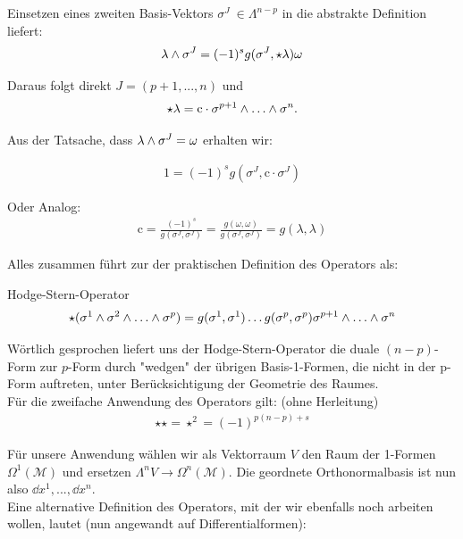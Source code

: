 Einsetzen eines zweiten Basis-Vektors $\sigma^J \ \in \Lambda^{n-p}$ in die abstrakte Definition liefert:
\begin{align}
\lambda \wedge \sigma^J = (-1)^s g(\sigma^J,\star \lambda)\omega
\end{align}

Daraus folgt direkt $J = (p+1, ..., n)$ und 
\begin{align}
\star\lambda = \text{c} \cdot \sigma^{p+1} \w \dots \w \sigma^n.
\end{align}

Aus der Tatsache, dass $\lambda \wedge \sigma^J = \omega$ erhalten wir:

\begin{align}
1 = (-1)^s g(\sigma^J,\text{c}\cdot\sigma^J)
\end{align}

Oder Analog:
\begin{align}
\text{c}= \frac{(-1)^s}{g(\sigma^J,\sigma^J)} = \frac{g(\omega,\omega)}{g(\sigma^J,\sigma^J)} = g(\lambda,\lambda)
\end{align}

Alles zusammen führt zur der praktischen Definition des Operators als:
\begin{mybox}{Hodge-Stern-Operator}
\begin{align}
\star(\sigma^1 \w \sigma^2 \w \dots \w \sigma^p) = g(\sigma^1,\sigma^1)\dots g(\sigma^p,\sigma^p) \sigma^{p+1}\w \dots \w \sigma^n
\end{align}
\end{mybox}


Wörtlich gesprochen liefert uns der Hodge-Stern-Operator die duale $(n-p)$-Form zur $p$-Form durch "wedgen" der übrigen Basis-1-Formen, die nicht in der p-Form auftreten, unter Berücksichtigung der Geometrie des Raumes. \\

 Für die zweifache Anwendung des Operators gilt: (ohne Herleitung)
 \begin{align}
 \star \star = \star^2 = (-1)^{p(n-p)+s}
 \end{align}


Für unsere Anwendung wählen wir als Vektorraum $V$ den Raum der 1-Formen $\Omega^1(\mathcal{M})$ und ersetzen $\Lambda^n V \rightarrow \Omega^n(\mathcal{M})$. Die geordnete Orthonormalbasis ist nun also ${\dd x^1, ..., \dd x^n}$. \\



Eine alternative Definition des Operators, mit der wir ebenfalls noch arbeiten wollen, lautet (nun angewandt auf Differentialformen):

